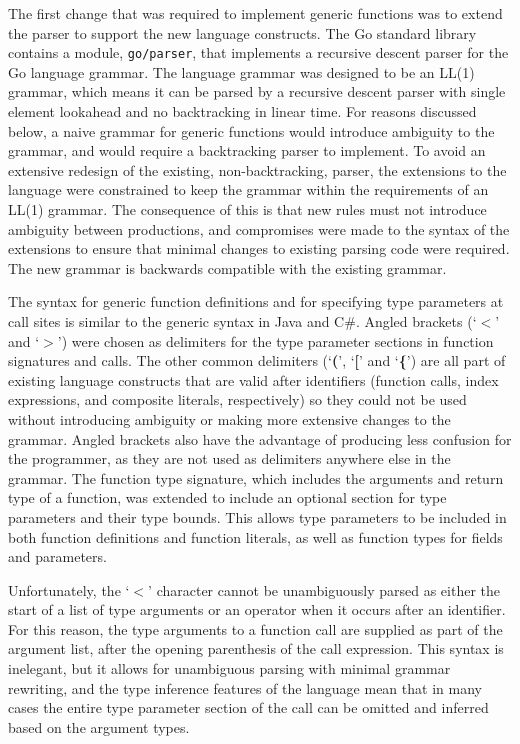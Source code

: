 \documentclass[letterpaper,twocolumn,11pt]{article}
\begin{document}
The first change that was required to implement generic functions was to extend the parser to support the new language constructs. The Go standard library contains a module, \texttt{go/parser}, that implements a recursive descent parser for the Go language grammar. The language grammar was designed to be an LL(1) grammar, which means it can be parsed by a recursive descent parser with single element lookahead and no backtracking in linear time. For reasons discussed below, a naive grammar for generic functions would introduce ambiguity to the grammar, and would require a backtracking parser to implement. To avoid an extensive redesign of the existing, non-backtracking, parser, the extensions to the language were constrained to keep the grammar within the requirements of an LL(1) grammar. The consequence of this is that new rules must not introduce ambiguity between productions, and compromises were made to the syntax of the extensions to ensure that minimal changes to existing parsing code were required. The new grammar is backwards compatible with the existing grammar.

The syntax for generic function definitions and for specifying type parameters at call sites is similar to the generic syntax in Java and C\#. Angled brackets (`\textbf{$<$}' and `\textbf{$>$}') were chosen as delimiters for the type parameter sections in function signatures and calls. The other common delimiters (`\textbf{(}', `\textbf{[}' and `\textbf{\{}') are all part of existing language constructs that are valid after identifiers (function calls, index expressions, and composite literals, respectively) so they could not be used without introducing ambiguity or making more extensive changes to the grammar. Angled brackets also have the advantage of producing less confusion for the programmer, as they are not used as delimiters anywhere else in the grammar. The function type signature, which includes the arguments and return type of a function, was extended to include an optional section for type parameters and their type bounds. This allows type parameters to be included in both function definitions and function literals, as well as function types for fields and parameters.

Unfortunately, the `\textbf{$<$}' character cannot be unambiguously parsed as either the start of a list of type arguments or an operator when it occurs after an identifier. For this reason, the type arguments to a function call are supplied as part of the argument list, after the opening parenthesis of the call expression. This syntax is inelegant, but it allows for unambiguous parsing with minimal grammar rewriting, and the type inference features of the language mean that in many cases the entire type parameter section of the call can be omitted and inferred based on the argument types.
\end{document}
